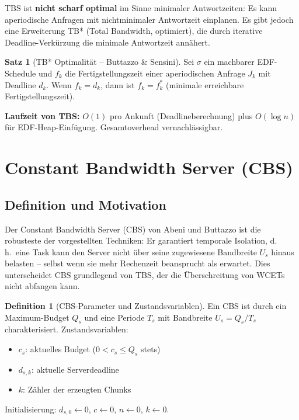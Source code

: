 ﻿\documentclass[a4paper,12pt]{report}
\theoremstyle{definition}
\newtheorem{definition}{Definition}[chapter]
\newtheorem{satz}{Satz}[chapter]
\begin{document}
TBS ist \textbf{nicht scharf optimal} im Sinne minimaler Antwortzeiten: Es kann
aperiodische Anfragen mit nichtminimaler Antwortzeit einplanen. Es gibt jedoch
eine Erweiterung TB* (Total Bandwidth, optimiert), die durch iterative Deadline-Verkürzung die minimale Antwortzeit annähert.

\begin{satz}[TB* Optimalität -- Buttazzo \& Sensini]
	Sei $\sigma$ ein machbarer EDF-Schedule und $f_k$ die Fertigstellungszeit
	einer aperiodischen Anfrage $J_k$ mit Deadline $d_k$. Wenn $f_k = d_k$, dann
	ist $f_k = f_k^*$ (minimale erreichbare Fertigstellungszeit).
\end{satz}

\textbf{Laufzeit von TBS:} $O(1)$ pro Ankunft (Deadlineberechnung) plus $O(\log n)$
für EDF-Heap-Einfügung. Gesamtoverhead vernachlässigbar.

\section{Constant Bandwidth Server (CBS)}

\subsection{Definition und Motivation}

Der Constant Bandwidth Server (CBS) von Abeni und Buttazzo \cite{Buttazzo2011}
ist die robusteste der vorgestellten Techniken: Er garantiert temporale Isolation,
d.\,h.\ eine Task kann den Server nicht über seine zugewiesene Bandbreite $U_s$
hinaus belasten -- selbst wenn sie mehr Rechenzeit beansprucht als erwartet.
Dies unterscheidet CBS grundlegend von TBS, der die Überschreitung von WCETs
nicht abfangen kann.

\begin{definition}[CBS-Parameter und Zustandsvariablen]
	Ein CBS ist durch ein Maximum-Budget $Q_s$ und eine Periode $T_s$ mit
	Bandbreite $U_s = Q_s/T_s$ charakterisiert. Zustandsvariablen:
	\begin{itemize}
		\item $c_s$: aktuelles Budget ($0 < c_s \leq Q_s$ stets)
		\item $d_{s,k}$: aktuelle Serverdeadline
		\item $k$: Zähler der erzeugten Chunks
	\end{itemize}
	Initialisierung: $d_{s,0} \leftarrow 0$, $c \leftarrow 0$, $n \leftarrow 0$, $k \leftarrow 0$.
\end{definition}
\end{document}
